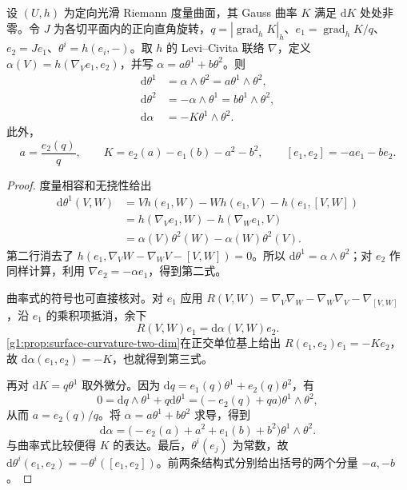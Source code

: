 \begin{proposition}\label{g1:prop:normalized-surface-structure}
	设 \((U,h)\) 为定向光滑 Riemann 度量曲面，其 Gauss 曲率 \(K\) 满足 \(\mathrm dK\) 处处非零。令 \(J\) 为各切平面内的正向直角旋转，\(q=|\operatorname{grad}_h K|_h\)、\(e_1=\operatorname{grad}_h K/q\)、\(e_2=Je_1\)、\(\theta^i=h(e_i,-)\)。取 \(h\) 的 Levi--Civita 联络 \(\nabla\)，定义 \(\alpha(V)=h(\nabla_Ve_1,e_2)\)，并写 \(\alpha=a\theta^1+b\theta^2\)。则
	\begin{equation}\label{g1:eq:normalized-surface-structure}
		\begin{aligned}
			\mathrm{d}\theta^1&=\alpha\wedge\theta^2=a\theta^1\wedge\theta^2,\\
			\mathrm{d}\theta^2&=-\alpha\wedge\theta^1=b\theta^1\wedge\theta^2,\\
			\mathrm{d}\alpha&=-K\theta^1\wedge\theta^2.
		\end{aligned}
	\end{equation}
	此外，
	\begin{equation}\label{g1:eq:normalized-surface-coefficients}
		a=\frac{e_2(q)}q,\qquad
		K=e_2(a)-e_1(b)-a^2-b^2,\qquad
		[e_1,e_2]=-ae_1-be_2.
	\end{equation}
\end{proposition}
\begin{proof}
	度量相容和无挠性给出
	\[
		\begin{aligned}
			\mathrm{d}\theta^1(V,W)
			&=Vh(e_1,W)-Wh(e_1,V)-h(e_1,[V,W])\\
			&=h(\nabla_Ve_1,W)-h(\nabla_We_1,V)\\
			&=\alpha(V)\theta^2(W)-\alpha(W)\theta^2(V).
		\end{aligned}
	\]
	第二行消去了 \(h(e_1,\nabla_VW-\nabla_WV-[V,W])=0\)。所以 \(\mathrm{d}\theta^1=\alpha\wedge\theta^2\)；对 \(e_2\) 作同样计算，利用 \(\nabla e_2=-\alpha e_1\)，得到第二式。

	曲率式的符号也可直接核对。对 \(e_1\) 应用 \(R(V,W)=\nabla_V\nabla_W-\nabla_W\nabla_V-\nabla_{[V,W]}\)，沿 \(e_1\) 的乘积项抵消，余下
	\[
		R(V,W)e_1=\mathrm{d}\alpha(V,W)e_2.
	\]
	\cref{g1:prop:surface-curvature-two-dim}在正交单位基上给出 \(R(e_1,e_2)e_1=-Ke_2\)，故 \(\mathrm{d}\alpha(e_1,e_2)=-K\)，也就得到第三式。

	再对 \(\mathrm{d}K=q\theta^1\) 取外微分。因为 \(\mathrm{d}q=e_1(q)\theta^1+e_2(q)\theta^2\)，有
	\[
		0=\mathrm{d}q\wedge\theta^1+q\mathrm{d}\theta^1
		=\bigl(-e_2(q)+qa\bigr)\theta^1\wedge\theta^2,
	\]
	从而 \(a=e_2(q)/q\)。将 \(\alpha=a\theta^1+b\theta^2\) 求导，得到
	\[
		\mathrm{d}\alpha
		=\bigl(-e_2(a)+a^2+e_1(b)+b^2\bigr)\theta^1\wedge\theta^2.
	\]
	与曲率式比较便得 \(K\) 的表达。最后，\(\theta^i(e_j)\) 为常数，故 \(\mathrm{d}\theta^i(e_1,e_2)=-\theta^i([e_1,e_2])\)。前两条结构式分别给出括号的两个分量 \(-a,-b\)。
\end{proof}

